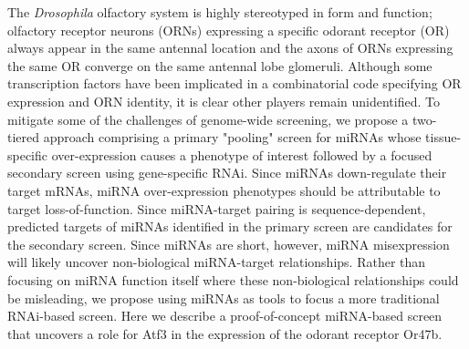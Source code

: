 The \emph{Drosophila} olfactory system is highly stereotyped in form and function; olfactory receptor neurons (ORNs) expressing a specific odorant receptor (OR) always appear in the same antennal location and the axons of ORNs expressing the same OR converge on the same antennal lobe glomeruli. Although some transcription factors have been implicated in a combinatorial code specifying OR expression and ORN identity, it is clear other players remain unidentified. To mitigate some of the challenges of genome-wide screening, we propose a two-tiered approach comprising a primary "pooling" screen for miRNAs whose tissue-specific over-expression causes a phenotype of interest followed by a focused secondary screen using gene-specific RNAi. Since miRNAs down-regulate their target mRNAs, miRNA over-expression phenotypes should be attributable to target loss-of-function. Since miRNA-target pairing is sequence-dependent, predicted targets of miRNAs identified in the primary screen are candidates for the secondary screen. Since miRNAs are short, however, miRNA misexpression will likely uncover non-biological miRNA-target relationships. Rather than focusing on miRNA function itself where these non-biological relationships could be misleading, we propose using miRNAs as tools to focus a more traditional RNAi-based screen. Here we describe a proof-of-concept miRNA-based screen that uncovers a role for Atf3 in the expression of the odorant receptor Or47b.